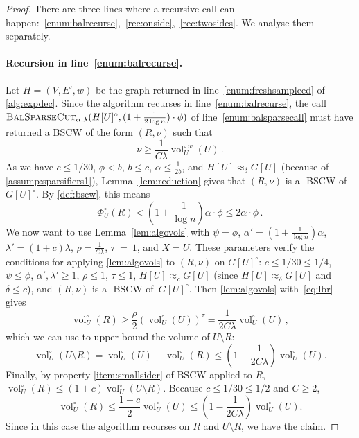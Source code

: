 \documentclass[epsfig,letter,11pt]{article}
\numberwithin{equation}{section}
\newcommand{\unvolc}[2]{\operatorname{vol}_{#2}^\circ (#1)}
\newcommand{\wvolc}[2]{\operatorname{vol}_{#2}^{\circ \,w} (#1)}
\newcommand{\unspc}[2]{\Phi_{#2}^\circ (#1)}
\newcommand{\bsc}{\textsc{BalSparseCut}_{\alpha,\lambda}}
\begin{document}
\begin{proof}
	There are three lines where a recursive call can happen:~\eqref{enum:balrecurse},~\eqref{rec:onside},~\eqref{rec:twosides}. We analyse them separately.
	
	\paragraph{Recursion in line~\eqref{enum:balrecurse}.} Let $H=(V,E',w)$ be the graph returned in line~\eqref{enum:freshsampleed} of \cref{alg:expdec}. Since the algorithm recurses in line~\eqref{enum:balrecurse}, the call $ \bsc(H[U]^\circ, (1+\frac{1}{2 \log n}) \cdot \phi)$ of line~\eqref{enum:balsparsecall} must have returned a BSCW of the form $(R,\nu)$ such that
	\begin{equation}
		\label{eq:lbr}
		\nu \ge \frac{1}{C \lambda}\wvolc{U}{U} \, .
	\end{equation}
	As we have $c \le 1/30$, $\phi < b$, $b \le c$, $\alpha \le \frac{1}{2b}$, and $H[U] \approx_\delta G[U]$ (because of \cref{assump:sparsifiers1}),  Lemma~\ref{lem:reduction} gives that $(R,\nu)$ is a  -BSCW of~$G[U]^\circ$. By \cref{def:bscw}, this means
	\begin{equation*}
		\unspc{R}{U} < \left(1+\frac{1}{\log n}\right)\alpha\cdot \phi \le 2\alpha \cdot \phi \, .
	\end{equation*}
	We now want to use Lemma~\ref{lem:algovols} with $\psi = \phi$, $ \alpha'=(1+\frac{1}{\log n})\alpha$, $\lambda' =(1+c)\lambda$, $\rho= \frac{1}{C\lambda}$, $\tau~=~1$, and $X=U$. These parameters verify the conditions for applying \cref{lem:algovols} to $(R,\nu)$ on $G[U]^\circ$: $c \le 1/30 \le 1/4$, $\psi \le \phi$, $\alpha',\lambda' \ge 1$, $\rho \le 1$, $\tau \le 1$, $H[U] \approx_{c} G[U]$ (since $H[U] \approx_{\delta} G[U]$ and $\delta \le c$), and $(R,\nu)$ is a -BSCW of~$G[U]^\circ$. Then \cref{lem:algovols} with~\eqref{eq:lbr} gives
	\begin{equation*}
		\unvolc{R}{U} \geq  \frac{\rho}{2} (\unvolc{U}{U})^\tau = \frac{1}{2C\lambda} \unvolc{U}{U}\, ,
	\end{equation*}
	which we can use to upper bound the volume of $U \setminus R$:
	\begin{equation*}
		\unvolc{U \setminus R}{U} = \unvolc{U}{U} - \unvolc{R}{U} \leq \left( 1 -  \frac{1}{2C\lambda} \right) \unvolc{U}{U}.
	\end{equation*}
	Finally, by property \eqref{item:smallsider} of BSCW applied to $R$, $\unvolc{R}{U} \leq (1 + c) \unvolc{U \setminus R}{U}$. Because $c \leq 1/30 \le 1/2$ and $C \ge 2$,
	\begin{equation*}
		\unvolc{R}{U} \leq \frac{1+c}{2} \unvolc{U}{U} \leq \left( 1 -  \frac{1}{2C\lambda} \right) \unvolc{U}{U}.
	\end{equation*}
	Since in this case the algorithm recurses on $R$ and $U\setminus R$, we have the claim.
	

\end{proof}
\end{document}
